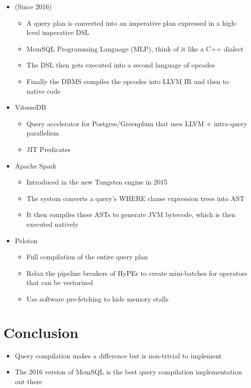 \documentclass[11pt]{article}
\begin{document}
\begin{itemize}
    \item {} (Since 2016)
    \begin{itemize}
        \item A query plan is converted into an imperative plan expressed in a high-level imperative DSL
        \item MemSQL Programming Language (MLP), think of it like a C++ dialect
        \item The DSL then gets executed into a second language of opcodes
        \item Finally the DBMS compiles the opcodes into LLVM IR and then to native code
    \end{itemize}
    \item VitesseDB
    \begin{itemize}
        \item Query accelerator for Postgres/Greenplum that uses LLVM + intra-query parallelism
        \item JIT Predicates
    \end{itemize}
    \item Apache Spark
    \begin{itemize}
        \item Introduced in the new Tungsten engine in 2015
        \item The system converts a query's WHERE clause expression trees into AST
        \item It then compiles these ASTs to generate JVM bytecode, which is then executed natively
    \end{itemize}
    \item Peloton
    \begin{itemize}
        \item Full compilation of the entire query plan
        \item Relax the pipeline breakers of HyPEr to create mini-batches for operators that can be vectorized
        \item Use software pre-fetching to hide memory stalls
    \end{itemize}
\end{itemize}

\section{Conclusion}
\begin{itemize}
    \item Query compilation makes a difference but is non-trivial to implement
    \item The 2016 version of MemSQL is the best query compilation implementation out there
\end{itemize}

\newpage


\end{document}
